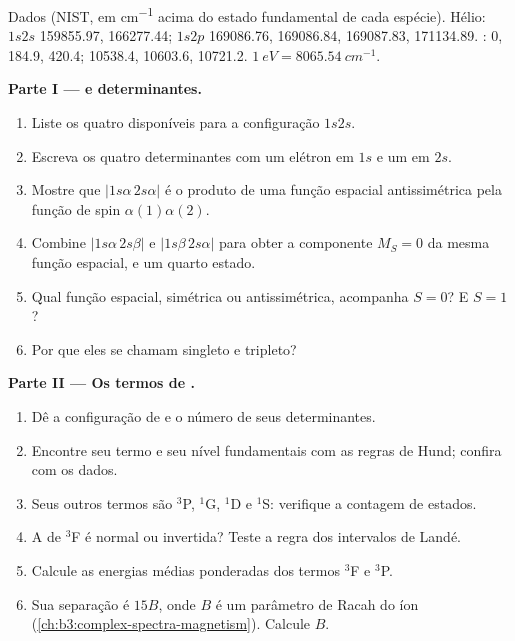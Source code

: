 \begin{problem}
\label{pb:b3:many-electron-atoms:1}
Dados (NIST, em \unit{cm^{-1}} acima do estado fundamental de cada espécie). Hélio:
$1s2s$  159855.97,  166277.44; $1s2p$
 169086.76, 169086.84, 169087.83, 
171134.89. :  0, 184.9, 420.4; 
10538.4, 10603.6, 10721.2. $\qty{1}{eV} = \qty{8065.54}{cm^{-1}}$.

\medskip\noindent\textbf{Parte I ---  e determinantes.}
\begin{enumerate}
  \item Liste os quatro  disponíveis para a configuração $1s2s$.
  \item Escreva os quatro determinantes com um elétron em $1s$ e um em
        $2s$.
  \item Mostre que $|1s\alpha\,2s\alpha|$ é o produto de uma função espacial
        antissimétrica pela função de spin $\alpha(1)\alpha(2)$.
  \item Combine $|1s\alpha\,2s\beta|$ e $|1s\beta\,2s\alpha|$ para obter a
        componente $M_S = 0$ da mesma função espacial, e um quarto estado.
  \item Qual função espacial, simétrica ou antissimétrica, acompanha
        $S = 0$? E $S = 1$?
  \item Por que eles se chamam singleto e tripleto?
\end{enumerate}

\medskip\noindent\textbf{Parte II --- Os termos de .}
\begin{enumerate}[resume]
  \item Dê a configuração de  e o número de seus
        determinantes.
  \item Encontre seu termo e seu nível fundamentais com as regras de Hund;
        confira com os dados.
  \item Seus outros termos são ${}^3$P, ${}^1$G, ${}^1$D e ${}^1$S: verifique a
        contagem de estados.
  \item A  de ${}^3$F é normal ou invertida? Teste a regra dos
        intervalos de Landé.
  \item Calcule as energias médias ponderadas dos termos ${}^3$F e ${}^3$P.
  \item Sua separação é $15B$, onde $B$ é um parâmetro de Racah do
        íon (\cref{ch:b3:complex-spectra-magnetism}). Calcule $B$.
\end{enumerate}


\end{problem}
